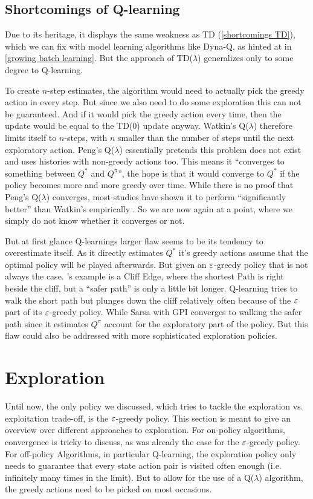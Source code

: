 \subsection{Shortcomings of Q-learning}\label{shortcomings Q-learning}
Due to its heritage, it displays the same weakness as TD (\ref{shortcomings TD}), which we can fix with model learning algorithms like Dyna-Q, as hinted at in \ref{growing batch learning}. But the approach of TD(\(\lambda\)) generalizes only to some degree to Q-learning. 

To create \(n\)-step estimates, the algorithm would need to actually pick the greedy action in every step. But since we also need to do some exploration this can not be guaranteed. And if it would pick the greedy action every time, then the update would be equal to the TD(0) update anyway. Watkin's Q(\(\lambda\)) therefore limits itself to \(n\)-steps, with \(n\) smaller than the number of steps until the next exploratory action. Peng's Q(\(\lambda\)) essentially pretends this problem does not exist and uses histories with non-greedy actions too. This means it ``converges to something between \(Q^*\) and \(Q^\pi\)'', the hope is that it would converge to \(Q^*\) if the policy becomes more and more greedy over time. While there is no proof that Peng's Q(\(\lambda\)) converges, most studies have shown it to perform ``significantly better'' than Watkin's empirically \parencite[184]{suttonReinforcementLearningIntroduction1998}. So we are now again at a point, where we simply do not know whether it converges or not. 

But at first glance Q-learnings larger flaw seems to be its tendency to overestimate itself. As it directly estimates \(Q^*\) it's greedy actions assume that the optimal policy will be played afterwards. But given an \(\varepsilon\)-greedy policy that is not always the case. \citeauthor{suttonReinforcementLearningIntroduction1998}'s example is a Cliff Edge, where the shortest Path is right beside the cliff, but a ``safer path'' is only a little bit longer. Q-learning tries to walk the short path but plunges down the cliff relatively often because of the \(\varepsilon\) part of its \(\varepsilon\)-greedy policy. While Sarsa with GPI converges to walking the safer path since it estimates \(Q^\pi\) account for the exploratory part of the policy. But this flaw could also be addressed with more sophisticated exploration policies. 

\section{Exploration}
Until now, the only policy we discussed, which tries to tackle the exploration vs. exploitation trade-off, is the \(\varepsilon\)-greedy policy. This section is meant to give an overview over different approaches to exploration. For on-policy algorithms, convergence is tricky to discuss, as was already the case for the \(\varepsilon\)-greedy policy. For off-policy Algorithms, in particular Q-learning, the exploration policy only needs to guarantee that every state action pair is visited often enough (i.e. infinitely many times in the limit).
But to allow for the use of a Q(\(\lambda\)) algorithm, the greedy actions need to be picked on most occasions. 


